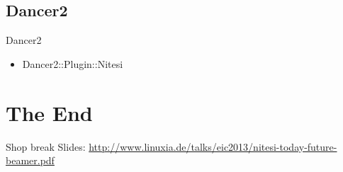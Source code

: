 \subsection{Dancer2}
\begin{frame}{Dancer2}
\begin{itemize}
\item Dancer2::Plugin::Nitesi
\end{itemize}
\end{frame}

\section{The End}

\begin{frame}{Shop break}
Slides:
\url{http://www.linuxia.de/talks/eic2013/nitesi-today-future-beamer.pdf}
\end{frame}



